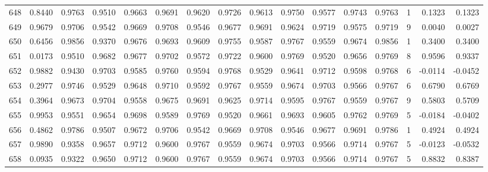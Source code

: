 \begin{tabular}{lrrrrrrrrrrrrrrr}
648 &      0.8440 &  0.9763 &  0.9510 &  0.9663 &  0.9691 &  0.9620 &  0.9726 &  0.9613 &  0.9750 &  0.9577 &   0.9743 &     0.9763 &      1 &                    0.1323 &                     0.1323 \\
649 &      0.9679 &  0.9706 &  0.9542 &  0.9669 &  0.9708 &  0.9546 &  0.9677 &  0.9691 &  0.9624 &  0.9719 &   0.9575 &     0.9719 &      9 &                    0.0040 &                     0.0027 \\
650 &      0.6456 &  0.9856 &  0.9370 &  0.9676 &  0.9693 &  0.9609 &  0.9755 &  0.9587 &  0.9767 &  0.9559 &   0.9674 &     0.9856 &      1 &                    0.3400 &                     0.3400 \\
651 &      0.0173 &  0.9510 &  0.9682 &  0.9677 &  0.9702 &  0.9572 &  0.9722 &  0.9600 &  0.9769 &  0.9520 &   0.9656 &     0.9769 &      8 &                    0.9596 &                     0.9337 \\
652 &      0.9882 &  0.9430 &  0.9703 &  0.9585 &  0.9760 &  0.9594 &  0.9768 &  0.9529 &  0.9641 &  0.9712 &   0.9598 &     0.9768 &      6 &                   -0.0114 &                    -0.0452 \\
653 &      0.2977 &  0.9746 &  0.9529 &  0.9648 &  0.9710 &  0.9592 &  0.9767 &  0.9559 &  0.9674 &  0.9703 &   0.9566 &     0.9767 &      6 &                    0.6790 &                     0.6769 \\
654 &      0.3964 &  0.9673 &  0.9704 &  0.9558 &  0.9675 &  0.9691 &  0.9625 &  0.9714 &  0.9595 &  0.9767 &   0.9559 &     0.9767 &      9 &                    0.5803 &                     0.5709 \\
655 &      0.9953 &  0.9551 &  0.9654 &  0.9698 &  0.9589 &  0.9769 &  0.9520 &  0.9661 &  0.9693 &  0.9605 &   0.9762 &     0.9769 &      5 &                   -0.0184 &                    -0.0402 \\
656 &      0.4862 &  0.9786 &  0.9507 &  0.9672 &  0.9706 &  0.9542 &  0.9669 &  0.9708 &  0.9546 &  0.9677 &   0.9691 &     0.9786 &      1 &                    0.4924 &                     0.4924 \\
657 &      0.9890 &  0.9358 &  0.9657 &  0.9712 &  0.9600 &  0.9767 &  0.9559 &  0.9674 &  0.9703 &  0.9566 &   0.9714 &     0.9767 &      5 &                   -0.0123 &                    -0.0532 \\
658 &      0.0935 &  0.9322 &  0.9650 &  0.9712 &  0.9600 &  0.9767 &  0.9559 &  0.9674 &  0.9703 &  0.9566 &   0.9714 &     0.9767 &      5 &                    0.8832 &                     0.8387 \\

\end{tabular}
